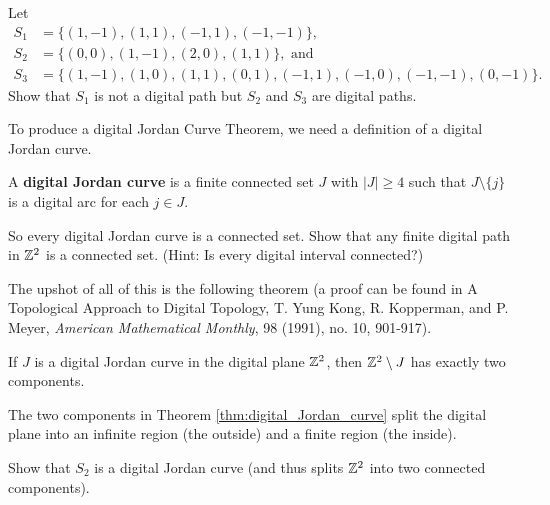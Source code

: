 \begin{activity}
Let 
\begin{align*}
S_1 &= \{(1,-1), (1,1), (-1,1), (-1,-1)\}, \\
S_2 &= \{(0,0), (1,-1), (2,0), (1,1)\}, \text{ and } \\
S_3 &= \{(1,-1), (1,0), (1,1), (0,1), (-1,1), (-1,0), (-1,-1), (0,-1)\}.
\end{align*}
Show that $S_1$ is not a digital path but $S_2$ and $S_3$ are digital paths.  

\item To produce a digital Jordan Curve Theorem, we need a definition of a digital Jordan curve. 

\begin{definition} A \textbf{digital Jordan curve} is a finite connected set $J$ with $|J| \geq 4$ such that $J \setminus \{j\}$ is a digital arc for each $j \in J$.
\end{definition}

So every digital Jordan curve is a connected set. Show that any finite digital path in $\mathbb{Z}^2$ is a connected set. (Hint: Is every digital interval connected?)

\item The upshot of all of this is the following theorem (a proof can be found in A Topological Approach to Digital Topology, T. Yung Kong,  R. Kopperman, and P. Meyer, \emph{American Mathematical Monthly}, 98 (1991), no. 10, 901-917).

\begin{theorem} \label{thm:digital_Jordan_curve} If $J$ is a digital Jordan curve in the digital plane $\mathbb{Z}^2$, then $\mathbb{Z}^2 \setminus J$ has exactly two components. 
\end{theorem}

The two components in Theorem \ref{thm:digital_Jordan_curve} split the digital plane into an infinite region (the outside) and a finite region (the inside). 

Show that $S_2$ is a digital Jordan curve (and thus splits $\mathbb{Z}^2$ into two connected components). 

\ea

\end{activity}

